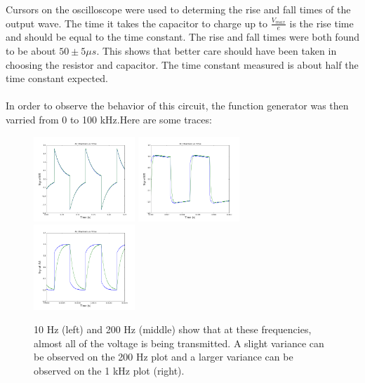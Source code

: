 \documentclass[a4paper,12pt]{article}
\newcommand{\F}[2]{\ensuremath{\frac{#1}{#2}}}
\begin{document}
Cursors on the oscilloscope were used to determing the rise and fall times of the output wave.  The time it takes the capacitor to charge up to $\F{V_{max}}{e}$ is the rise time and should be equal to the time constant. The rise and fall times were both found to be about $50\pm5\mu s$.  This shows that better care should have been taken in choosing the resistor and capacitor.  The time constant measured is about half the time constant expected.
\\
\\
In order to observe the behavior of this circuit, the function generator was then varried from 0 to 100 kHz.\newpage  \noindent Here are some traces:\\
\begin{figure}[h]
\centering
\includegraphics[width=1.5in]{sam_lab2/2g_10hz.png}
\includegraphics[width=1.5in]{sam_lab2/2g_200hz.png}
\includegraphics[width=1.5in]{sam_lab2/2g_1kHz.png}
\caption{10 Hz (left) and 200 Hz (middle) show that at these frequencies, almost all of the voltage is being transmitted.  A slight variance can be observed on the 200 Hz plot and a larger variance can be observed on the 1 kHz plot (right).}
\end{figure}
\end{document}
